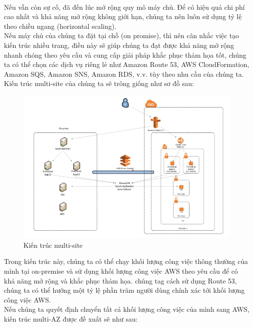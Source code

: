 \begin{itemize}
    \\[0.2cm]
    Nếu vẫn còn sự cố, đã đến lúc mở rộng quy mô máy chủ. Để có hiệu quả chi phí cao nhất và khả năng mở rộng không giới hạn, chúng ta nên luôn sử dụng tỷ lệ theo chiều ngang (horizontal scaling).\\[0.5cm]
    Nếu máy chủ của chúng ta đặt tại chỗ (on promise), thì nên cân nhắc việc tạo kiến trúc nhiều trang, điều này sẽ giúp chúng ta đạt được khả năng mở rộng nhanh chóng theo yêu cầu và cung cấp giải pháp khắc phục thảm họa tốt, chúng ta có thể chọn các dịch vụ riêng lẻ như Amazon Route 53, AWS CloudFormation, Amazon SQS, Amazon SNS, Amazon RDS, v.v. tùy theo nhu cầu của chúng ta.\\[0.5cm]
    Kiến trúc multi-site của chúng ta sẽ trông giống như sơ đồ sau:
    \begin{figure}[H]
        \begin{center}
        \includegraphics[scale=0.8]{images/hieu/chap-2/multi-site-architecture.png}
        \vspace*{5mm}
        \caption{Kiến trúc multi-site}
        \end{center}
    \end{figure}
        Trong kiến trúc này, chúng ta có thể chạy khối lượng công việc thông thường của mình tại on-premise và sử dụng khối lượng công việc AWS theo yêu cầu để có khả năng mở rộng và khắc phục thảm họa. chúng tag cách sử dụng Route 53, chúng ta có thể hướng một tỷ lệ phần trăm người dùng chính xác tới khối lượng công việc AWS.\\[0.5cm]
        Nếu chúng ta quyết định chuyển tất cả khối lượng công việc của mình sang AWS, kiến trúc multi-AZ được đề xuất sẽ như sau:
        \begin{figure}[H]

\end{figure}
\end{itemize}

